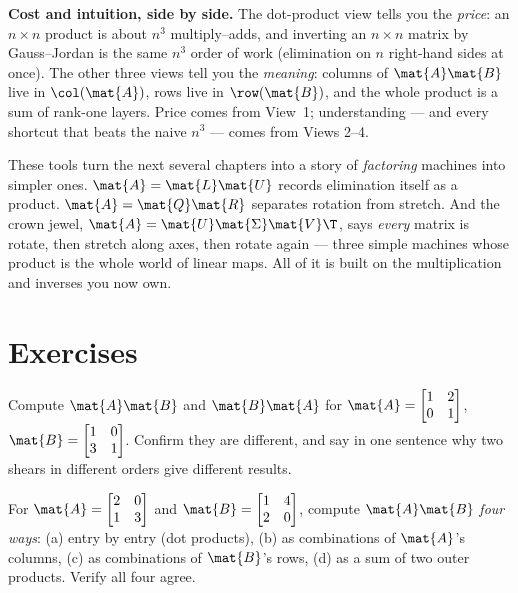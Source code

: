 \begin{focusbox}
\textbf{Cost and intuition, side by side.} The dot-product view tells you the
\emph{price}: an $n\times n$ product is about $n^3$ multiply--adds, and inverting an
$n\times n$ matrix by Gauss--Jordan is the same $n^3$ order of work (elimination on $n$
right-hand sides at once). The other three views tell you the \emph{meaning}: columns of
$\mat{A}\mat{B}$ live in $\col(\mat{A})$, rows live in $\row(\mat{B})$, and the whole
product is a sum of rank-one layers. Price comes from View~1; understanding --- and every
shortcut that beats the naive $n^3$ --- comes from Views 2--4.
\end{focusbox}

These tools turn the next several chapters into a story of \emph{factoring} machines into
simpler ones. $\mat{A} = \mat{L}\mat{U}$ records elimination itself as a product.
$\mat{A} = \mat{Q}\mat{R}$ separates rotation from stretch. And the crown jewel,
$\mat{A} = \mat{U}\mat{\Sigma}\mat{V}\T$, says \emph{every} matrix is rotate, then
stretch along axes, then rotate again --- three simple machines whose product is the
whole world of linear maps. All of it is built on the multiplication and inverses you
now own.

\section{Exercises}
\label{ch08:exercises}

\begin{exercise}
Compute $\mat{A}\mat{B}$ and $\mat{B}\mat{A}$ for
$\mat{A} = \begin{bmatrix} 1 & 2 \\ 0 & 1 \end{bmatrix}$,
$\mat{B} = \begin{bmatrix} 1 & 0 \\ 3 & 1 \end{bmatrix}$. Confirm they are different, and
say in one sentence why two shears in different orders give different results.
\end{exercise}

\begin{exercise}
For $\mat{A} = \begin{bmatrix} 2 & 0 \\ 1 & 3 \end{bmatrix}$ and
$\mat{B} = \begin{bmatrix} 1 & 4 \\ 2 & 0 \end{bmatrix}$, compute $\mat{A}\mat{B}$
\emph{four ways}: (a) entry by entry (dot products), (b) as combinations of $\mat{A}$'s
columns, (c) as combinations of $\mat{B}$'s rows, (d) as a sum of two outer products.
Verify all four agree.
\end{exercise}

